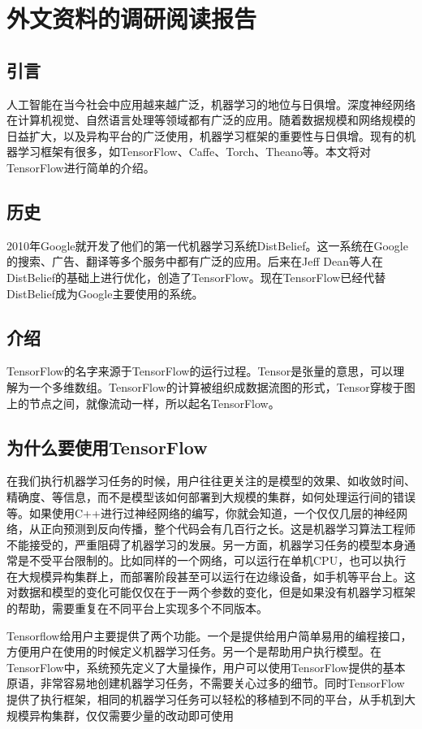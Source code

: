 \chapter{外文资料的调研阅读报告}
\section{引言}
人工智能在当今社会中应用越来越广泛，机器学习的地位与日俱增。深度神经网络在计算机视觉、自然语言处理等领域都有广泛的应用。随着数据规模和网络规模的日益扩大，以及异构平台的广泛使用，机器学习框架的重要性与日俱增。现有的机器学习框架有很多，如TensorFlow、Caffe、Torch、Theano等。本文将对TensorFlow\cite{tensorflow}进行简单的介绍。

\section{历史}
2010年Google就开发了他们的第一代机器学习系统DistBelief。这一系统在Google的搜索、广告、翻译等多个服务中都有广泛的应用。后来在Jeff Dean等人在DistBelief的基础上进行优化，创造了TensorFlow。现在TensorFlow已经代替DistBelief成为Google主要使用的系统。

\section{介绍}
TensorFlow的名字来源于TensorFlow的运行过程。Tensor是张量的意思，可以理解为一个多维数组。TensorFlow的计算被组织成数据流图的形式，Tensor穿梭于图上的节点之间，就像流动一样，所以起名TensorFlow。

\section{为什么要使用TensorFlow}
在我们执行机器学习任务的时候，用户往往更关注的是模型的效果、如收敛时间、精确度、等信息，而不是模型该如何部署到大规模的集群，如何处理运行间的错误等。如果使用C++进行过神经网络的编写，你就会知道，一个仅仅几层的神经网络，从正向预测到反向传播，整个代码会有几百行之长。这是机器学习算法工程师不能接受的，严重阻碍了机器学习的发展。另一方面，机器学习任务的模型本身通常是不受平台限制的。比如同样的一个网络，可以运行在单机CPU，也可以执行在大规模异构集群上，而部署阶段甚至可以运行在边缘设备，如手机等平台上。这对数据和模型的变化可能仅仅在于一两个参数的变化，但是如果没有机器学习框架的帮助，需要重复在不同平台上实现多个不同版本。

Tensorflow给用户主要提供了两个功能。一个是提供给用户简单易用的编程接口，方便用户在使用的时候定义机器学习任务。另一个是帮助用户执行模型。在TensorFlow中，系统预先定义了大量操作，用户可以使用TensorFlow提供的基本原语，非常容易地创建机器学习任务，不需要关心过多的细节。同时TensorFlow提供了执行框架，相同的机器学习任务可以轻松的移植到不同的平台，从手机到大规模异构集群，仅仅需要少量的改动即可使用

